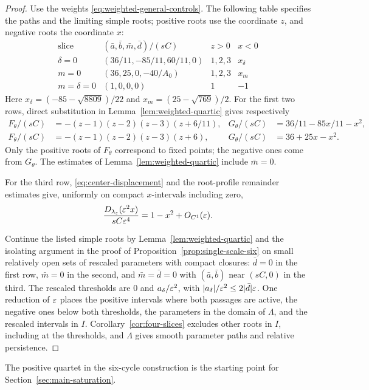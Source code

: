 \begin{proof}
Use the weights \eqref{eq:weighted-general-controls}. The following table
specifies the paths and the limiting simple roots; positive roots use the
coordinate $z$, and negative roots the coordinate $x$:
\begin{equation}\label{eq:sharp-slice-controls}
 \begin{array}{c|c|c|c}
 \text{slice}&(\bar a,\bar b,\bar m,\bar d)/(sC)&z>0&x<0\\ \hline
 \delta=0&(36/11,-85/11,60/11,0)&1,2,3&x_\delta\\
 m=0&(36,25,0,-40/A_0)&1,2,3&x_m\\
 m=\delta=0&(1,0,0,0)&1&-1
 \end{array}
\end{equation}
Here $x_\delta=(-85-\sqrt{8809})/22$ and
$x_m=(25-\sqrt{769})/2$. For the first two rows, direct substitution in
Lemma~\ref{lem:weighted-quartic} gives respectively
\[
 \begin{aligned}
 F_\theta/(sC)&=-(z-1)(z-2)(z-3)(z+6/11),&
 G_\theta/(sC)&=36/11-85x/11-x^2,\\
 F_\theta/(sC)&=-(z-1)(z-2)(z-3)(z+6),&
 G_\theta/(sC)&=36+25x-x^2.
 \end{aligned}
\]
Only the positive roots of $F_\theta$ correspond to fixed points; the
negative ones come from $G_\theta$. The estimates of
Lemma~\ref{lem:weighted-quartic} include $\bar m=0$.

For the third row, \eqref{eq:center-displacement} and the root-profile
remainder estimates give, uniformly on compact $x$-intervals including zero,
\[
 \frac{D_{\lambda_\varepsilon}(\varepsilon^2x)}{sC\varepsilon^4}
 =1-x^2+O_{C^1}(\varepsilon).
\]

Continue the listed simple roots by Lemma~\ref{lem:weighted-quartic} and
the isolating argument in the proof of Proposition~\ref{prop:single-scale-six}
on small relatively open sets of rescaled parameters with compact closures:
$\bar d=0$ in the first row, $\bar m=0$ in the second, and $\bar m=\bar d=0$
with $(\bar a,\bar b)$ near $(sC,0)$ in the third. The rescaled thresholds
are $0$ and $a_\delta/\varepsilon^2$, with
$|a_\delta|/\varepsilon^2\le2|\bar d|\varepsilon$. One reduction of
$\varepsilon$ places the positive intervals where both passages are active, the
negative ones below both thresholds, the parameters in the domain of
$\Lambda$, and the rescaled intervals in $I$.
Corollary~\ref{cor:four-slices} excludes other roots in $I$, including at the
thresholds, and $\Lambda$ gives smooth parameter paths and relative
persistence.
\end{proof}

The positive quartet in the six-cycle construction is the starting point for
Section~\ref{sec:main-saturation}.
